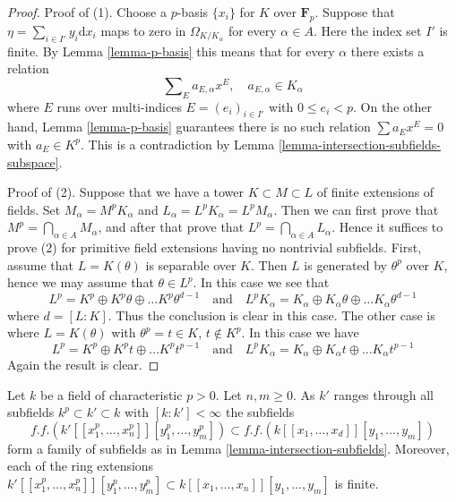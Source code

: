 \begin{proof}
Proof of (1).
Choose a $p$-basis $\{x_i\}$ for $K$ over $\mathbf{F}_p$.
Suppose that $\eta = \sum_{i \in I'} y_i \text{d}x_i$ maps to zero in
$\Omega_{K/K_\alpha}$ for every $\alpha \in A$. Here the index set
$I'$ is finite. By Lemma \ref{lemma-p-basis}
this means that for every $\alpha$ there exists a relation
$$
\sum\nolimits_E a_{E, \alpha} x^E,\quad a_{E, \alpha} \in K_\alpha
$$
where $E$ runs over multi-indices $E = (e_i)_{i \in I'}$ with
$0 \leq e_i < p$. On the other hand, Lemma \ref{lemma-p-basis}
guarantees there is no such relation $\sum a_E x^E = 0$ with
$a_E \in K^p$. This is a contradiction by
Lemma \ref{lemma-intersection-subfields-subspace}.

\medskip\noindent
Proof of (2). Suppose that we have a tower $K \subset M \subset L$
of finite extensions of fields. Set $M_\alpha = M^p K_\alpha$
and $L_\alpha = L^p K_\alpha = L^p M_\alpha$. Then we can first prove that
$M^p = \bigcap_{\alpha \in A} M_\alpha$, and after that prove
that $L^p = \bigcap_{\alpha \in A} L_\alpha$. Hence it suffices to
prove (2) for primitive field extensions having no nontrivial subfields.
First, assume that $L = K(\theta)$ is separable over $K$. Then
$L$ is generated by $\theta^p$ over $K$, hence we may assume that
$\theta \in L^p$. In this case we see that
$$
L^p = K^p \oplus K^p\theta \oplus \ldots K^p\theta^{d - 1}
\quad\text{and}\quad
L^pK_\alpha =
K_\alpha \oplus K_\alpha \theta \oplus \ldots K_\alpha\theta^{d - 1}
$$
where $d = [L : K]$. Thus the conclusion is clear in this case. The other
case is where $L = K(\theta)$ with $\theta^p = t \in K$, $t \not \in K^p$.
In this case we have
$$
L^p = K^p \oplus K^pt \oplus \ldots K^pt^{p - 1}
\quad\text{and}\quad
L^pK_\alpha =
K_\alpha \oplus K_\alpha t \oplus \ldots K_\alpha t^{p - 1}
$$
Again the result is clear.
\end{proof}

\begin{lemma}
\label{lemma-power-series-ring-subfields}
Let $k$ be a field of characteristic $p > 0$. Let $n, m \geq 0$.
As $k'$ ranges through all subfields $k^p \subset k' \subset k$
with $[k : k'] < \infty$ the subfields
$$
f.f.(k'[[x_1^p, \ldots, x_n^p]][y_1^p, \ldots, y_m^p])
\subset
f.f.(k[[x_1, \ldots, x_d]][y_1, \ldots, y_m])
$$
form a family of subfields as in Lemma \ref{lemma-intersection-subfields}.
Moreover, each of the ring extensions
$k'[[x_1^p, \ldots, x_n^p]][y_1^p, \ldots, y_m^p] \subset
k[[x_1, \ldots, x_n]][y_1, \ldots, y_m]$ is finite.
\end{lemma}

